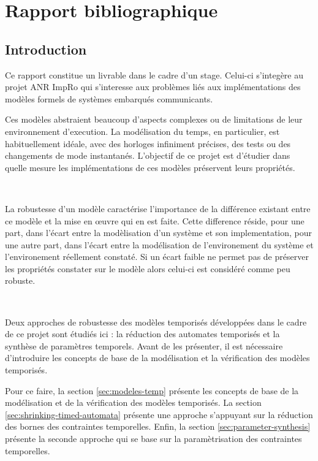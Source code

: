 \chapter{Rapport bibliographique}
  \section*{Introduction}

    Ce rapport constitue un livrable dans le cadre d'un stage. Celui-ci
    s'integère au projet ANR ImpRo\footnotemark{} qui s'interesse aux problèmes
    liés aux implémentations des modèles formels de systèmes embarqués
    communicants.


    Ces modèles abstraient beaucoup d'aspects complexes ou de limitations de
    leur environnement d'execution. La modélisation du temps, en particulier,
    est habituellement idéale, avec des horloges infiniment précises, des tests
    ou des changements de mode instantanés. L'objectif de ce projet est
    d'étudier dans quelle mesure les implémentations de ces modèles préservent
    leurs propriétés.

    ~
    
    La robustesse d'un modèle caractérise l'importance de la différence existant
    entre ce modèle et la mise en \oe uvre qui en est faite. Cette difference
    réside, pour une part, dans l'écart entre la modèlisation d'un système et
    son implementation, pour une autre part, dans l'écart entre la modélisation
    de l'environement du système et l'environement réellement constaté. Si un
    écart faible ne permet pas de préserver les propriétés constater sur le
    modèle alors celui-ci est considéré comme peu robuste.

    ~
    
    Deux approches de robustesse des modèles temporisés développées dans le
    cadre de ce projet sont étudiés ici : la réduction des automates temporisés
    et la synthèse de paramètres temporels. Avant de les présenter, il est
    nécessaire d'introduire les concepts de base de la modélisation et la
    vérification des modèles temporisés.

    Pour ce faire, la section \ref{sec:modeles-temp} présente les concepts de
    base de la modélisation et de la vérification des modèles temporisés. La
    section \ref{sec:shrinking-timed-automata} présente une approche s'appuyant
    sur la réduction des bornes des contraintes temporelles. Enfin, la section
    \ref{sec:parameter-synthesis} présente la seconde approche qui se base sur
    la paramètrisation des contraintes temporelles.

